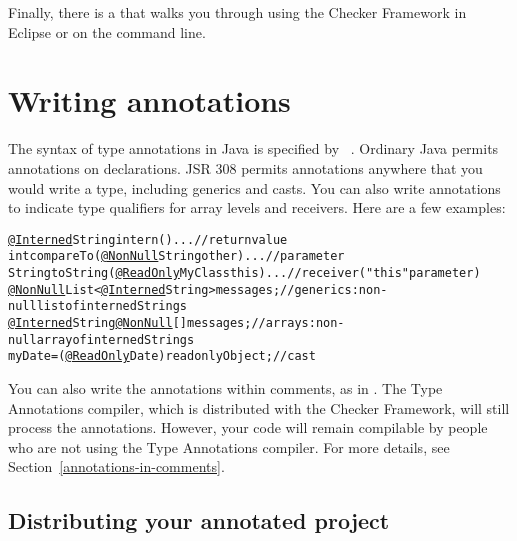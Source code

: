 Finally, there is a 
that walks you through using the Checker Framework in Eclipse or on the
command line.



\section{Writing annotations\label{writing-annotations}}

The syntax of type annotations in Java is specified by
~\cite{JSR308-2008-09-12}.  Ordinary
Java permits annotations on declarations.  JSR 308 permits annotations
anywhere that you would write a type, including generics and casts.  You
can also write annotations to indicate type qualifiers for array levels and
receivers.  Here are a few examples:

\begin{alltt}
  \underline{@Interned} String intern() \ttlcb{} ... \ttrcb{}               // return value
  int compareTo(\underline{@NonNull} String other) \ttlcb{} ... \ttrcb{}    // parameter
  String toString(\underline{@ReadOnly} MyClass this) \ttlcb{} ... \ttrcb{} // receiver ("this" parameter)
  \underline{@NonNull} List<\underline{@Interned} String> messages;       // generics:  non-null list of interned Strings
  \underline{@Interned} String \underline{@NonNull} [] messages;          // arrays:  non-null array of interned Strings
  myDate = (\underline{@ReadOnly} Date) readonlyObject;       // cast
\end{alltt}

You can also write the annotations within comments, as in
.  The Type Annotations compiler, which is
distributed with the Checker Framework, will still process
the annotations.
However, your code will remain compilable by people who are not using the
Type Annotations compiler.  For more details, see
Section~\ref{annotations-in-comments}.



\subsection{Distributing your annotated project\label{distributing}}

